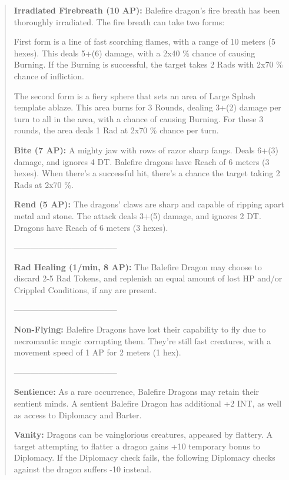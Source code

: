\documentclass[11pt,a4paper,twocolumn]{book}
\begin{document}
	\begin{verse}
		\textbf{Irradiated Firebreath (10 AP):} Balefire dragon's fire breath has been thoroughly irradiated. The fire breath can take two forms: 
		
		First form is a line of fast scorching flames, with a range of 10 meters (5 hexes). This deals 5+(6) damage, with a 2x40 \% chance of causing Burning. If the Burning is successful, the target takes 2 Rads with 2x70 \% chance of infliction.
		
		The second form is a fiery sphere that sets an area of Large Splash template ablaze. This area burns for 3 Rounds, dealing 3+(2) damage per turn to all in the area, with a chance of causing Burning. For these 3 rounds, the area deals 1 Rad at 2x70 \% chance per turn.
		
		\textbf{Bite (7 AP):} A mighty jaw with rows of razor sharp fangs. Deals 6+(3) damage, and ignores 4 DT. Balefire dragons have Reach of 6 meters (3 hexes). When there's a successful hit, there's a chance the target taking 2 Rads at 2x70 \%.
		
		\textbf{Rend (5 AP):} The dragons' claws are sharp and capable of ripping apart metal and stone. The attack deals 3+(5) damage, and ignores 2 DT. Dragons have Reach of 6 meters (3 hexes).
		
		--------------------------------------
		
		\textbf{Rad Healing (1/min, 8 AP):} The Balefire Dragon may choose to discard 2-5 Rad Tokens, and replenish an equal amount of lost HP and/or Crippled Conditions, if any are present.
		
		--------------------------------------
		
		\textbf{Non-Flying:} Balefire Dragons have lost their capability to fly due to necromantic magic corrupting them. They're still fast creatures, with a movement speed of 1 AP for 2 meters (1 hex).
		
		--------------------------------------

		\textbf{\dag Sentience:} As a rare occurrence, Balefire Dragons may retain their sentient minds. A sentient Balefire Dragon has additional +2 INT, as well as access to Diplomacy and Barter. 
		
		\textbf{\dag Vanity:} Dragons can be vainglorious creatures, appeased by flattery. A target attempting to flatter a dragon gains +10 temporary bonus to Diplomacy. If the Diplomacy check fails, the following Diplomacy checks against the dragon suffers -10 instead.
		
	\end{verse}
	
\end{document}
